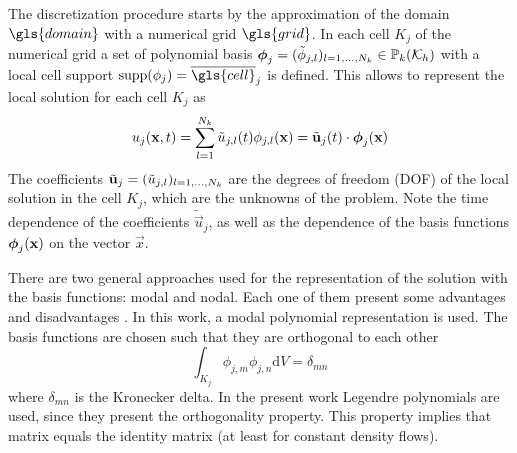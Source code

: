 The discretization procedure starts by the approximation of the domain $\gls{domain}$ with a numerical grid $\gls{grid}$. In each cell $K_j$ of the numerical grid a set of polynomial basis $\boldsymbol{\mathbf{\phi}}_j = (\tilde{\phi}_{j,l})_{l=1,\dots,N_k} \in \mathbb{P}_k(\mathcal{K}_h)$ with a local cell support $\text{supp}(\phi_j) = \overline{\gls{cell}}_j$ is defined. This allows to represent the local solution for each cell $K_j$ as
\begin{equation}
u_j(\textbf{x},t) = \sum_{l=1}^{N_k}\tilde{u}_{j,l}(t)\phi_{j,l}(\textbf{x}) = \tilde{\textbf{u}}_j(t) \cdot \boldsymbol{\mathbf{\phi}}_j (\textbf{x})\label{eq:DGAnsatz}
\end{equation}
The coefficients $\tilde{\boldsymbol{\mathbf{u}}}_j = (\tilde{u}_{j,l})_{l=1,\dots,N_k}$ are the degrees of freedom (DOF) of the local solution in the cell $K_j$, which are the unknowns of the problem. Note the time dependence of the coefficients $\tilde{\vec{u}}_j$, as well as the dependence of the basis functions $\boldsymbol{\mathbf{\phi}}_j (\textbf{x})$ on the vector $\vec{x}$. 

There are two general approaches used for the representation of the solution with the basis functions: modal and nodal. Each one of them present some advantages and disadvantages \parencite{hesthavenNodalDiscontinuousGalerkin2008}. In this work, a modal polynomial representation is used. The basis functions are chosen such that they are orthogonal to each other 
\begin{equation}
	\int_{K_j} \phi_{j,m}\phi_{j,n} \text{d}V= \delta_{mn}
\end{equation}
where $\delta_{mn}$ is the Kronecker delta. In the present work Legendre polynomials are used, since they present the orthogonality property. This property implies that matrix equals the identity matrix (at least for constant density flows).

